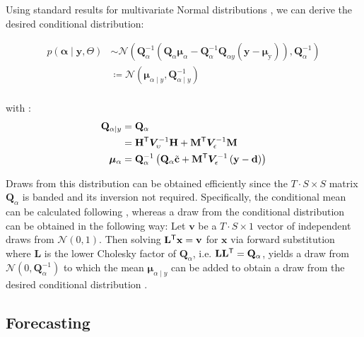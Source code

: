\documentclass[notitlepage,a4paper,12pt]{article}
\newcommand{\transpose}[1]{{#1}^{\sf{T}}}
\begin{document}
Using standard results for multivariate Normal distributions \citep[e.g.][pp. 86-87]{bishop_prml_2006}, we can derive the desired conditional distribution:

\begin{align*}
    p
    \left(
        \boldsymbol{\alpha} \mid \mathbf{y}, \Theta
     \right) 
    &\sim
    \mathcal{N}
    \left(
    \mathbf{Q}^{-1}_{\alpha} \left( \mathbf{Q}_{\alpha}\boldsymbol{\mu}_{\alpha} - \mathbf{Q}^{-1}_{\alpha} \mathbf{Q}_{\alpha y} \left(\mathbf{y} - \boldsymbol{\mu}_{\text{y}}\right)\right), \mathbf{Q}_{\alpha}^{-1}
    \right) \\
    &\coloneqq \mathcal{N}
        \left(
            \boldsymbol{\mu}_{\alpha\mid y}, \mathbf{Q}_{\alpha\mid y}^{-1}
        \right) \\
\end{align*}

with \citep[see also][eqn. 6-8]{chanjeliazkov_2009}:
\begin{align*}
    \mathbf{Q}_{\alpha\mid y} &= \mathbf{Q}_{\alpha} \\
    &= 
    \transpose{\mathbf{H}} \bm{V}^{-1}_{\upsilon} \mathbf{H} + {\transpose{\mathbf{M}} \bm{V}^{-1}_{\epsilon}\mathbf{M}}\\
    \boldsymbol\mu_{\alpha} &= \mathbf{Q}_{\alpha}^{-1} \left(\mathbf{Q}_{\alpha} \tilde{\mathbf{c}}+ \transpose{\mathbf{M}} \bm{V}_{\epsilon}^{-1} \left(\mathbf{y} - \mathbf{d}\right) \right)
\end{align*}

Draws from this distribution can be obtained efficiently since the $T\cdot S \times S$ matrix $\mathbf{Q}_{\alpha}$ is banded and its inversion not required. Specifically, the conditional mean can be calculated following \citet[][Algorithm 2.1]{rueheld_2005}, whereas a draw from the conditional distribution can be obtained in the following way: Let $\mathbf{v}$ be a $T\cdot S \times 1$ vector of independent draws from $\mathcal{N}(0,1)$. Then solving $\transpose{\mathbf{L}}\mathbf{x} = \mathbf{v}$ for $\mathbf{x}$ via forward substitution where $\mathbf{L}$ is the lower Cholesky factor of $\mathbf{Q}_{\alpha}$, i.e. $\mathbf{L}\transpose{\mathbf{L}} = \mathbf{Q}_{\alpha}$, yields a draw from $\mathcal{N}(0, \mathbf{Q}^{-1}_{\alpha})$ to which the mean $\boldsymbol{\mu}_{\alpha\mid y}$ can be added to obtain a draw from the desired conditional distribution \citep[][Algorithm 2.4]{rueheld_2005}.

\subsection{Forecasting}
\end{document}
